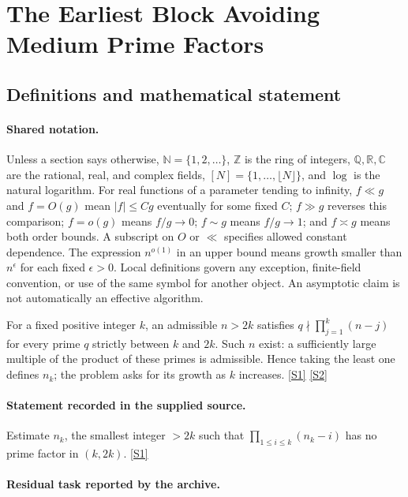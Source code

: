 \documentclass[11pt,a4paper]{article}
\newcommand{\N}{\mathbb{N}}
\newcommand{\Z}{\mathbb{Z}}
\newcommand{\Q}{\mathbb{Q}}
\newcommand{\R}{\mathbb{R}}
\newcommand{\C}{\mathbb{C}}
\newcommand{\sref}[2]{\hyperlink{source:#1:#2}{[S#2]}}
\begin{document}
\section{The Earliest Block Avoiding Medium Prime Factors}\label{statement}


\subsection{Definitions and mathematical statement}

\paragraph{Shared notation.}Unless a section says otherwise, $\N=\{1,2,\ldots\}$,
$\Z$ is the ring of integers, $\Q,\R,\C$ are the rational, real, and complex
fields, $[N]=\{1,\ldots,\lfloor N\rfloor\}$, and $\log$ is the natural
logarithm. For real functions of a parameter tending to infinity,
$f\ll g$ and $f=O(g)$ mean $|f|\leq Cg$ eventually for some fixed $C$;
$f\gg g$ reverses this comparison; $f=o(g)$ means $f/g\to0$;
$f\sim g$ means $f/g\to1$; and $f\asymp g$ means both order bounds.
A subscript on $O$ or $\ll$ specifies allowed constant dependence.
The expression $n^{o(1)}$ in an upper bound means growth smaller than
$n^\epsilon$ for each fixed $\epsilon>0$. Local definitions govern any
exception, finite-field convention, or use of the same symbol for another
object. An asymptotic claim is not automatically an effective algorithm.



For a fixed positive integer $k$, an admissible $n>2k$ satisfies $q\nmid\prod_{j=1}^{k}(n-j)$ for every prime $q$ strictly between $k$ and $2k$. Such $n$ exist: a sufficiently large multiple of the product of these primes is admissible. Hence taking the least one defines $n_k$; the problem asks for its growth as $k$ increases. \sref{statement}{1} \sref{statement}{2}

\paragraph{Statement recorded in the supplied source.}
Estimate $n_k$, the smallest integer $>2k$ such that $\prod_{1\leq i\leq k}(n_k-i)$ has no prime factor in $(k,2k)$. \sref{statement}{1}

\paragraph{Residual task reported by the archive.}
\end{document}
